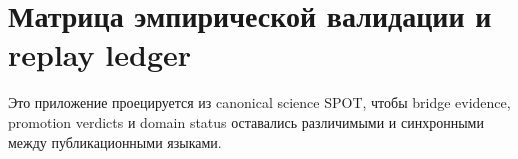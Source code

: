\section{Матрица эмпирической валидации и replay ledger}
\label{sec:oc-core-1-3-empirical-validation-matrix-ru}
\label{sec:oc-core-1-3-empirical-validation-matrix}

Это приложение проецируется из canonical science SPOT, чтобы bridge evidence,
promotion verdicts и domain status оставались различимыми и синхронными между
публикационными языками.

\begingroup
\footnotesize
\RaggedRight
\sloppy
\setlength{\tabcolsep}{2pt}
\setlength{\LTleft}{0pt}
\setlength{\LTright}{0pt}

\endgroup
